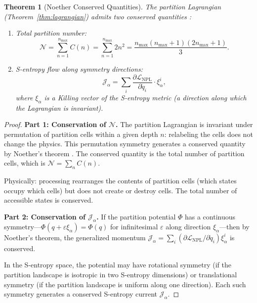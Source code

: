 \documentclass[twocolumn,10pt]{article}
\newtheorem{theorem}{Theorem}[section]
\theoremstyle{remark}
\newcommand{\eps}{\varepsilon}
\newcommand{\NPL}{\mathcal{L}_{\mathrm{NPL}}}
\begin{document}
\begin{theorem}[Noether Conserved Quantities]
\label{thm:noether}
The partition Lagrangian (Theorem~\ref{thm:lagrangian}) admits two conserved quantities \cite{noether1918}:
\begin{enumerate}
\item Total partition number:
\begin{equation}
\mathcal{N} = \sum_{n=1}^{n_{\max}} C(n) = \sum_{n=1}^{n_{\max}} 2n^2 = \frac{n_{\max}(n_{\max}+1)(2n_{\max}+1)}{3}.
\label{eq:conserved_N}
\end{equation}
\item S-entropy flow along symmetry directions:
\begin{equation}
\mathcal{J}_\alpha = \sum_i \frac{\partial\NPL}{\partial\dot{q}_i} \cdot \xi_\alpha^i,
\label{eq:conserved_J}
\end{equation}
where $\xi_\alpha$ is a Killing vector of the S-entropy metric (a direction along which the Lagrangian is invariant).
\end{enumerate}
\end{theorem}

\begin{proof}
\textbf{Part 1: Conservation of $\mathcal{N}$.}
The partition Lagrangian is invariant under permutation of partition cells within a given depth $n$: relabeling the cells does not change the physics. This permutation symmetry generates a conserved quantity by Noether's theorem \cite{noether1918}. The conserved quantity is the total number of partition cells, which is $\mathcal{N} = \sum_n C(n)$.

Physically: processing rearranges the contents of partition cells (which states occupy which cells) but does not create or destroy cells. The total number of accessible states is conserved.

\textbf{Part 2: Conservation of $\mathcal{J}_\alpha$.}
If the partition potential $\Phi$ has a continuous symmetry---$\Phi(q + \eps\xi_\alpha) = \Phi(q)$ for infinitesimal $\eps$ along direction $\xi_\alpha$---then by Noether's theorem, the generalized momentum $\mathcal{J}_\alpha = \sum_i (\partial\NPL/\partial\dot{q}_i) \xi_\alpha^i$ is conserved.

In the S-entropy space, the potential may have rotational symmetry (if the partition landscape is isotropic in two S-entropy dimensions) or translational symmetry (if the partition landscape is uniform along one direction). Each such symmetry generates a conserved S-entropy current $\mathcal{J}_\alpha$.
\end{proof}
\end{document}

